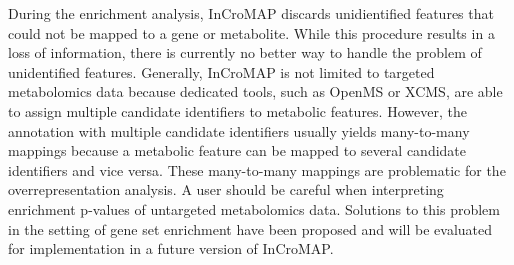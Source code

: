 \documentclass[final,5p,times,twocolumn]{elsarticle}
\begin{document}
During the enrichment analysis, InCroMAP discards unidientified features that could not be mapped to a gene or metabolite. While this procedure results in a loss of information, there is currently no better way to handle the problem of unidentified features. Generally, InCroMAP is not limited to targeted metabolomics data because dedicated tools, such as OpenMS or XCMS, are able to assign multiple candidate identifiers to metabolic features. However, the annotation with multiple candidate identifiers usually yields many-to-many mappings because a metabolic feature can be mapped to several candidate identifiers and vice versa. These many-to-many mappings are problematic for the overrepresentation analysis. A user should be careful when interpreting enrichment p-values of untargeted metabolomics data. Solutions to this problem in the setting of gene set enrichment have been proposed \cite{Kankainen2011} and will be evaluated for implementation in a future version of InCroMAP.
\end{document}
